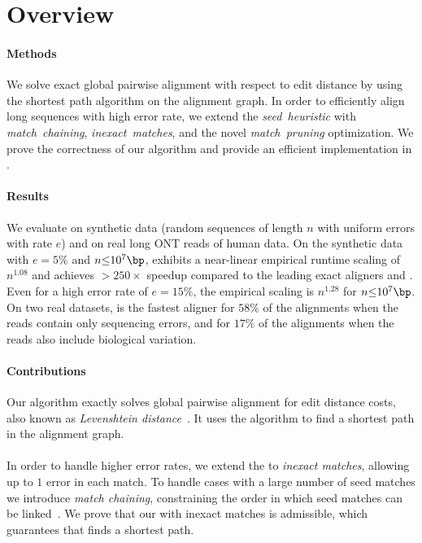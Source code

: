 

\section{Overview}

\paragraph{Methods}
We solve exact global pairwise alignment with respect to edit distance by using
the \A shortest path algorithm on the alignment graph. In order to efficiently
align long sequences with high error rate, we extend the \emph{seed~heuristic}
with \emph{match~chaining}, \emph{inexact~matches}, and the novel
\emph{match~pruning} optimization. We prove the correctness of our algorithm and
provide an efficient implementation in \astarpa.

\paragraph{Results}
We evaluate \astarpa on synthetic data (random sequences of length $n$ with
uniform errors with rate $e$) and on real long ONT reads of human data. On the
synthetic data with $e{=}5\%$ and $n{\leq}10^7\bp$, \astarpa exhibits a
near-linear empirical runtime scaling of $n^{1.08}$ and achieves ${>}250\times$
speedup compared to the leading exact aligners \edlib and \wfa. Even for a high
error rate of $e{=}15\%$, the empirical scaling is $n^{1.28}$ for
$n{\leq}10^7\bp$. On two real datasets, \astarpa is the fastest aligner for
$58\%$ of the alignments when the reads contain only sequencing errors, and for
$17\%$ of the alignments when the reads also include biological variation.

\paragraph{Contributions}
Our algorithm exactly solves global pairwise alignment for edit distance costs,
also known as \emph{Levenshtein distance}~\citep{levenshtein1966binary}. It uses
the \A algorithm to find a shortest path in the alignment graph.

\paragraph{\Sh} In order to handle higher error rates, we extend the \emph{\sh}
to \emph{inexact matches}, allowing up to $1$ error in each match.  To handle
cases with a large number of seed matches we introduce \emph{match chaining},
constraining the order in which seed matches can be
linked~\citep{wilbur1984context,benson2016lcsk}. We prove that our \emph{\csh}
with inexact matches is admissible, which guarantees that \A finds a shortest
path.

